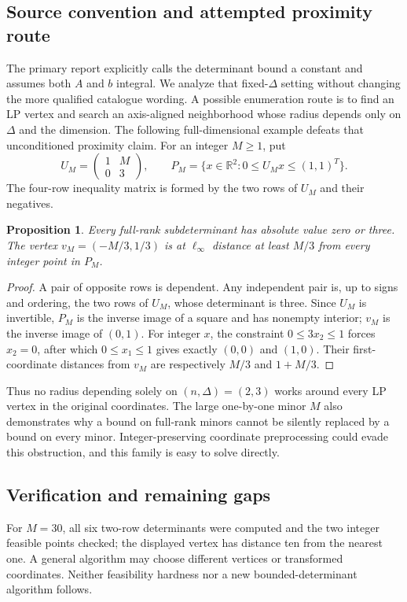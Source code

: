 \documentclass[11pt]{article}
\newtheorem{proposition}{Proposition}
\begin{document}
\subsection{Source convention and attempted proximity route}
The primary report explicitly calls the determinant bound a constant and assumes both $A$ and $b$ integral. We analyze that fixed-$\Delta$ setting without changing the more qualified catalogue wording. A possible enumeration route is to find an LP vertex and search an axis-aligned neighborhood whose radius depends only on $\Delta$ and the dimension. The following full-dimensional example defeats that unconditioned proximity claim.
For an integer $M\ge1$, put
\[
 U_M=\begin{pmatrix}1&M\\0&3\end{pmatrix},\qquad
 P_M=\{x\in\mathbb R^2:0\le U_Mx\le(1,1)^T\}.
\]
The four-row inequality matrix is formed by the two rows of $U_M$ and their negatives.
\begin{proposition}
Every full-rank subdeterminant has absolute value zero or three. The vertex $v_M=(-M/3,1/3)$ is at $\ell_\infty$ distance at least $M/3$ from every integer point in $P_M$.
\end{proposition}
\begin{proof}
A pair of opposite rows is dependent. Any independent pair is, up to signs and ordering, the two rows of $U_M$, whose determinant is three. Since $U_M$ is invertible, $P_M$ is the inverse image of a square and has nonempty interior; $v_M$ is the inverse image of $(0,1)$. For integer $x$, the constraint $0\le3x_2\le1$ forces $x_2=0$, after which $0\le x_1\le1$ gives exactly $(0,0)$ and $(1,0)$. Their first-coordinate distances from $v_M$ are respectively $M/3$ and $1+M/3$.
\end{proof}
Thus no radius depending solely on $(n,\Delta)=(2,3)$ works around every LP vertex in the original coordinates. The large one-by-one minor $M$ also demonstrates why a bound on full-rank minors cannot be silently replaced by a bound on every minor. Integer-preserving coordinate preprocessing could evade this obstruction, and this family is easy to solve directly.
\subsection{Verification and remaining gaps}
For $M=30$, all six two-row determinants were computed and the two integer feasible points checked; the displayed vertex has distance ten from the nearest one. A general algorithm may choose different vertices or transformed coordinates. Neither feasibility hardness nor a new bounded-determinant algorithm follows.
\end{document}

